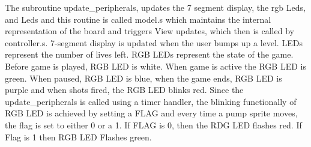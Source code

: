 

The subroutine update_peripherals, updates the 7 segment display, the rgb Leds, and Leds and
this routine is called model.s which maintains the internal representation of the board and
triggers View updates, which then is called by controller.s. 7-segment display is updated when
the user bumps up a level. LEDs represent the number of lives left. RGB LEDs represent the
state of the game. Before game is played, RGB LED is white. When game is active the RGB
LED is green. When paused, RGB LED is blue, when the game ends, RGB LED is purple and
when shots fired, the RGB LED blinks red. Since the update_peripherals is called using a timer
handler, the blinking functionally of RGB LED is achieved by setting a FLAG and every time a
pump sprite moves, the flag is set to either 0 or a 1. If FLAG is 0, then the RDG LED flashes red.
If Flag is 1 then RGB LED Flashes green.
